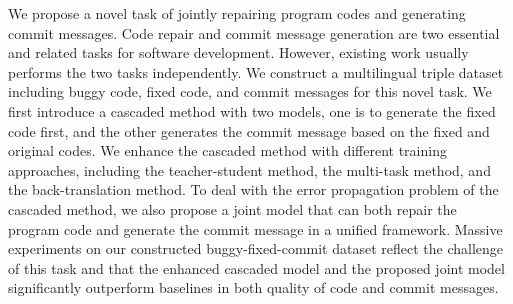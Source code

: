 We propose a novel task of jointly repairing program codes and generating commit messages. Code repair and commit message generation are two essential and related tasks for software development. However, existing work usually performs the two tasks independently. We construct a multilingual triple dataset including buggy code, fixed code, and commit messages for this novel task. We first introduce a cascaded method with two models, one is to generate the fixed code first, and the other generates the commit message based on the fixed and original codes. We enhance the cascaded method with different training approaches, including the teacher-student method, the multi-task method, and the back-translation method. To deal with the error propagation problem of the cascaded method, we also propose a joint model that can both repair the program code and generate the commit message in a unified framework. Massive experiments on our constructed buggy-fixed-commit dataset reflect the challenge of this task and that the enhanced cascaded model and the proposed joint model significantly outperform baselines in both quality of code and commit messages.

